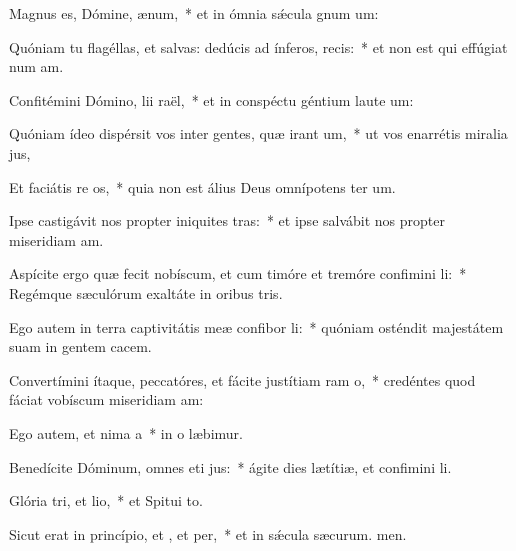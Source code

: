 \item Magnus es, Dómine,  ænum,~* et in ómnia sǽcula gnum um:
\item Quóniam tu flagéllas, et salvas: dedúcis ad ínferos,  recis:~* et non est qui effúgiat num am.
\item Confitémini Dómino, lii raël,~* et in conspéctu géntium laute um:
\item Quóniam ídeo dispérsit vos inter gentes, quæ irant um,~* ut vos enarrétis miralia jus,
\item Et faciátis re os,~* quia non est álius Deus omnípotens ter um.
\item Ipse castigávit nos propter iniquites tras:~* et ipse salvábit nos propter miseridiam am.
\item Aspícite ergo quæ fecit nobíscum, et cum timóre et tremóre confimini li:~* Regémque sæculórum exaltáte in oribus tris.
\item Ego autem in terra captivitátis meæ confibor li:~* quóniam osténdit majestátem suam in gentem cacem.
\item Convertímini ítaque, peccatóres, et fácite justítiam ram o,~* credéntes quod fáciat vobíscum miseridiam am:
\item Ego autem, et nima a~* in o læbimur.
\item Benedícite Dóminum, omnes eti jus:~* ágite dies lætítiæ, et confimini li.
\item Glória tri, et lio,~* et Spitui to.
\item Sicut erat in princípio, et , et per,~* et in sǽcula sæcurum. men.
